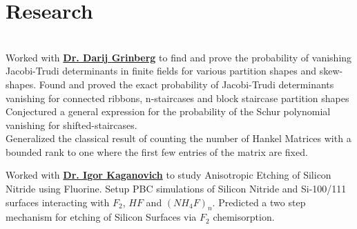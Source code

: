 \documentclass[]{deedy-resume-openfont}
\begin{document}
\begin{minipage}[t]{0.55\textwidth} 



\section{Research}
\vspace{3}
\\
Worked with \textbf{\href{https://www.cip.ifi.lmu.de/~grinberg/}{Dr. Darij Grinberg}} to find and prove the probability of vanishing Jacobi-Trudi determinants in finite fields for various partition shapes and skew-shapes.
\vspace{4}
\newline
\vspace{0.001}
\textbullet{} Found and proved the exact probability of Jacobi-Trudi determinants vanishing for connected ribbons, n-staircases and block staircase partition shapes \\
\textbullet{} Conjectured a general expression for the probability of the Schur polynomial vanishing for shifted-staircases. \\
\textbullet{} Generalized the classical result of counting the number of Hankel Matrices with a bounded rank to one where the first few entries of the matrix are fixed.

\sectionsep

Worked with \textbf{\href{https://theory.pppl.gov/people/profile.php?pid=2&n=Igor-Kaganovich}{Dr. Igor Kaganovich}} to study Anisotropic Etching of Silicon Nitride using Fluorine.
\vspace{4}
\newline
\vspace{0.01}
\textbullet{} Setup PBC simulations of Silicon Nitride and Si-100/111 surfaces interacting with $F_2$, $HF$ and $(NH_4F)_n$.
\newline
\textbullet{} Predicted a two step mechanism for etching of Silicon Surfaces via $F_2$ chemisorption.
\vspace{10}


\end{minipage}
\end{document}
